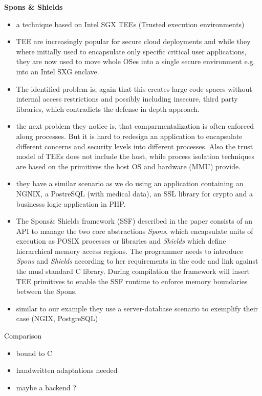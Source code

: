\textbf{Spons \& Shields}
\begin{itemize}
    \item a technique based on Intel SGX TEEs (Trusted execution environments)
    \item TEE are increasingly popular for secure cloud deployments and while they where initially used to encapsulate only specific critical user applications, they are now used to move whole OSes into a single secure environment e.g. into an Intel SXG enclave. 
    \item The identified problem is, again that this creates large code spaces without internal access restrictions and possibly including insecure, third party libraries, which contradicts the defense in depth approach.
    \item the next problem they notice is, that comparmentalization is often enforced along processes. But it is hard to redesign an application to encapsulate different concerns and security levels into different processes. Also the trust model of TEEs does not include the host, while process isolation techniques are based on the primitives the host OS and hardware (MMU) provide.
    \item they have a similar scenario as we do using an application containing an NGNIX, a PostreSQL (with medical data), an SSL library for crypto and a businesss logic application in PHP.
    \item The Spons\& Shields framework (SSF) described in the paper consists of an API to manage the two core abstractions \emph{Spons}, which encapsulate units of execution as POSIX processes or libraries and \emph{Shields} which define hierarchical memory access regions. The programmer needs to introduce \emph{Spons} and \emph{Shields} according to her requirements in the code and link against the musl standard C library. During compilation the framework will insert TEE primitives to enable the SSF runtime to enforce memory boundaries between the Spons.
    \item similar to our example they use a server-database scenario to exemplify their case (NGIX, PostgreSQL)
\end{itemize}
Comparison 
\begin{itemize}
    \item bound to C
    \item handwritten adaptations needed  
    \item maybe a backend ?
\end{itemize}




